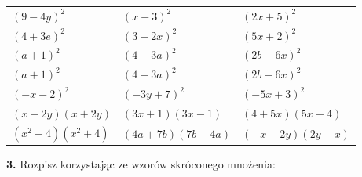 \documentclass[12pt,a4paper]{article}
\theoremstyle{break}
\begin{document}
	\begin{enumerate}[a)] \begin{tabular}{p{5cm} p{5cm} p{5cm}} 
		\item $(9-4y)^2$ & \vspace{0.25cm}\item$(x-3)^2$ &\vspace{0.25cm}\item $(2x+5)^2$\\
		\item $(4+3e)^2$ & \item $(3+2x)^2$ &\item $(5x+2)^2$\\
		\item $(a+1)^2$ & \item $(4-3a)^2$ &\item $(2b-6x)^2$\\
		\item $(a+1)^2$ & \item $(4-3a)^2$ &\item $(2b-6x)^2$\\
		\item $(-x-2)^2$ & \item $(-3y+7)^2$ &\item $(-5x+3)^2$\\
		\item $(x-2y)(x+2y)$ & \item $(3x+1)(3x-1)$ &\item $(4+5x)(5x-4)$\\
		\item $(x^2-4)(x^2+4)$ & \item $(4a+7b)(7b-4a)$ &\item $(-x-2y)(2y-x)$\\
\end{tabular} \end{enumerate}

\begin{mdframed}[style=zad]
	\vspace{0.2cm}
	\textbf{3.} Rozpisz korzystając ze wzorów skróconego mnożenia:
\end{mdframed}
\end{document}
